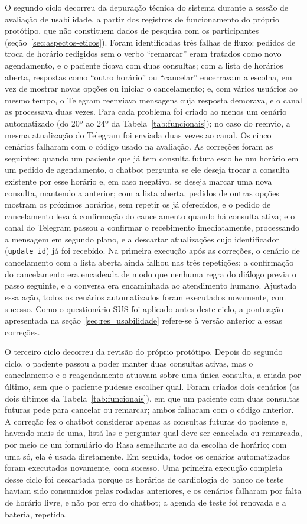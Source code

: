 \documentclass[12pt,a4paper]{extarticle}
\begin{document}
O segundo ciclo decorreu da depuração técnica do sistema durante a sessão de avaliação de usabilidade, a partir dos registros de funcionamento do próprio protótipo, que não constituem dados de pesquisa com os participantes (seção~\ref{sec:aspectos-eticos}). Foram identificadas três falhas de fluxo: pedidos de troca de horário redigidos sem o verbo ``remarcar'' eram tratados como novo agendamento, e o paciente ficava com duas consultas; com a lista de horários aberta, respostas como ``outro horário'' ou ``cancelar'' encerravam a escolha, em vez de mostrar novas opções ou iniciar o cancelamento; e, com vários usuários ao mesmo tempo, o Telegram reenviava mensagens cuja resposta demorava, e o canal as processava duas vezes. Para cada problema foi criado ao menos um cenário automatizado (do 20º ao 24º da Tabela~\ref{tab:funcionais}); no caso do reenvio, a mesma atualização do Telegram foi enviada duas vezes ao canal. Os cinco cenários falharam com o código usado na avaliação. As correções foram as seguintes: quando um paciente que já tem consulta futura escolhe um horário em um pedido de agendamento, o chatbot pergunta se ele deseja trocar a consulta existente por esse horário e, em caso negativo, se deseja marcar uma nova consulta, mantendo a anterior; com a lista aberta, pedidos de outras opções mostram os próximos horários, sem repetir os já oferecidos, e o pedido de cancelamento leva à confirmação do cancelamento quando há consulta ativa; e o canal do Telegram passou a confirmar o recebimento imediatamente, processando a mensagem em segundo plano, e a descartar atualizações cujo identificador (\texttt{update\_id}) já foi recebido. Na primeira execução após as correções, o cenário de cancelamento com a lista aberta ainda falhou nas três repetições: a confirmação do cancelamento era encadeada de modo que nenhuma regra do diálogo previa o passo seguinte, e a conversa era encaminhada ao atendimento humano. Ajustada essa ação, todos os cenários automatizados foram executados novamente, com sucesso. Como o questionário SUS foi aplicado antes deste ciclo, a pontuação apresentada na seção~\ref{sec:res_usabilidade} refere-se à versão anterior a essas correções.

O terceiro ciclo decorreu da revisão do próprio protótipo. Depois do segundo ciclo, o paciente passou a poder manter duas consultas ativas, mas o cancelamento e o reagendamento atuavam sobre uma única consulta, a criada por último, sem que o paciente pudesse escolher qual. Foram criados dois cenários (os dois últimos da Tabela~\ref{tab:funcionais}), em que um paciente com duas consultas futuras pede para cancelar ou remarcar; ambos falharam com o código anterior. A correção fez o chatbot considerar apenas as consultas futuras do paciente e, havendo mais de uma, listá-las e perguntar qual deve ser cancelada ou remarcada, por meio de um formulário do Rasa semelhante ao da escolha de horário; com uma só, ela é usada diretamente. Em seguida, todos os cenários automatizados foram executados novamente, com sucesso. Uma primeira execução completa desse ciclo foi descartada porque os horários de cardiologia do banco de teste haviam sido consumidos pelas rodadas anteriores, e os cenários falharam por falta de horário livre, e não por erro do chatbot; a agenda de teste foi renovada e a bateria, repetida.
\end{document}
